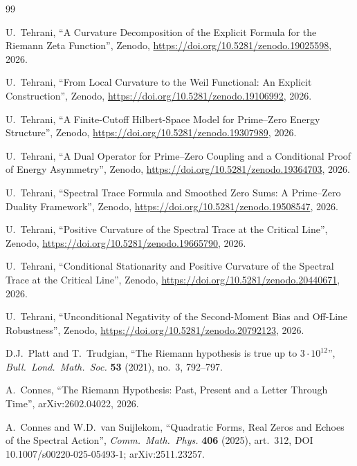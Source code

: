 \documentclass[11pt]{article}
\begin{document}
\newpage
\begin{thebibliography}{99}
\sloppy

U.~Tehrani,
``A Curvature Decomposition of the Explicit Formula
for the Riemann Zeta Function'',
Zenodo, \url{https://doi.org/10.5281/zenodo.19025598}, 2026.

U.~Tehrani,
``From Local Curvature to the Weil Functional:
An Explicit Construction'',
Zenodo, \url{https://doi.org/10.5281/zenodo.19106992}, 2026.

U.~Tehrani,
``A Finite-Cutoff Hilbert-Space Model
for Prime--Zero Energy Structure'',
Zenodo, \url{https://doi.org/10.5281/zenodo.19307989}, 2026.

U.~Tehrani,
``A Dual Operator for Prime--Zero Coupling
and a Conditional Proof of Energy Asymmetry'',
Zenodo, \url{https://doi.org/10.5281/zenodo.19364703}, 2026.

U.~Tehrani,
``Spectral Trace Formula and Smoothed Zero Sums:
A Prime--Zero Duality Framework'',
Zenodo, \url{https://doi.org/10.5281/zenodo.19508547}, 2026.

U.~Tehrani,
``Positive Curvature of the Spectral Trace
at the Critical Line'',
Zenodo, \url{https://doi.org/10.5281/zenodo.19665790}, 2026.

U.~Tehrani,
``Conditional Stationarity and Positive Curvature of the
Spectral Trace at the Critical Line'',
Zenodo, \url{https://doi.org/10.5281/zenodo.20440671}, 2026.

U.~Tehrani,
``Unconditional Negativity of the Second-Moment Bias
and Off-Line Robustness'',
Zenodo, \url{https://doi.org/10.5281/zenodo.20792123}, 2026.

D.J.~Platt and T.~Trudgian,
``The Riemann hypothesis is true up to $3\cdot10^{12}$'',
\emph{Bull.\ Lond.\ Math.\ Soc.} \textbf{53} (2021), no.~3, 792--797.

A.~Connes,
``The Riemann Hypothesis: Past, Present and a Letter Through Time'',
arXiv:2602.04022, 2026.

A.~Connes and W.D.~van Suijlekom,
``Quadratic Forms, Real Zeros and Echoes of the Spectral Action'',
\emph{Comm.\ Math.\ Phys.} \textbf{406} (2025), art.~312,
DOI 10.1007/s00220-025-05493-1; arXiv:2511.23257.


\end{thebibliography}
\end{document}
